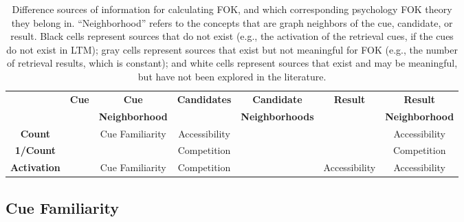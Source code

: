 \documentclass[10pt,letterpaper]{article}
\newcommand{\fixme}[2][]{#2}
\renewcommand{\fixme}[2][]{\textcolor{red}{#2}}
\newcommand{\tableheader}[1]{\multirow{2}{*}{\textbf{#1}}}
\newcommand{\whitecell}[0]{}
\newcommand{\graycell}[0]{\cellcolor{gray!70}}
\newcommand{\blackcell}[0]{\cellcolor{black}}
\begin{document}
\begin{table*}[ht]
\centering
\begin{tabular}{c|cccccc}
\whitecell           &  \tableheader{Cue}  &  \textbf{Cue}           &  \tableheader{Candidates}  &  \textbf{Candidate}      &  \tableheader{Result}  &  \textbf{Result}        \\  
\whitecell           &  \whitecell         &  \textbf{Neighborhood}  &  \whitecell                &  \textbf{Neighborhoods}  &  \whitecell            &  \textbf{Neighborhood}  \\  
\hline                                                                                                                                                                              
\textbf{Count}       &  \graycell          &  Cue Familiarity        &  Accessibility             &  \whitecell              &  \graycell             &  Accessibility          \\  
\textbf{1/Count}     &  \graycell          &  \whitecell             &  Competition               &  \whitecell              &  \graycell             &  Competition            \\  
\textbf{Activation}  &  \blackcell         &  Cue Familiarity        &  Competition               &  \whitecell              &  Accessibility         &  Accessibility          \\  
\end{tabular}

\caption{
    Difference sources of information for calculating FOK, and which corresponding psychology FOK theory they belong in.
    ``Neighborhood'' refers to the concepts that are graph neighbors of the cue, candidate, or result.
    Black cells represent sources that do not exist (e.g., the activation of the retrieval cues, if the cues do not exist in LTM);
    gray cells represent sources that exist but not meaningful for FOK (e.g., the number of retrieval results, which is constant);
    and white cells represent sources that exist and may be meaningful, but have not been explored in the literature.
    \fixme[Need to explain ``neighborhood'']{}
}
\label{sources}
\end{table*}

\subsection{Cue Familiarity}
\end{document}

